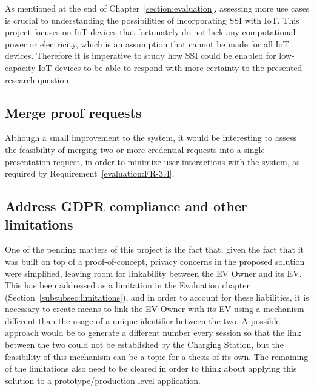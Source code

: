 As mentioned at the end of Chapter~\ref{section:evaluation}, assessing more use cases is crucial to understanding the possibilities of incorporating SSI with IoT. This project focuses on IoT devices that fortunately do not lack any computational power or electricity, which is an assumption that cannot be made for all IoT devices. Therefore it is imperative to study how SSI could be enabled for low-capacity IoT devices to be able to respond with more certainty to the presented research question.

\subsection*{Merge proof requests}
\label{subsubsec:merge_proof_requests}

Although a small improvement to the system, it would be interesting to assess the feasibility of merging two or more credential requests into a single presentation request, in order to minimize user interactions with the system, as required by Requirement~\ref{evaluation:FR-3.4}.

\subsection*{Address GDPR compliance and other limitations}
\label{subsubsec:address_gdpr_compliance}

One of the pending matters of this project is the fact that, given the fact that it was built on top of a proof-of-concept, privacy concerns in the proposed solution were simplified, leaving room for linkability between the EV Owner and its EV. This has been addressed as a limitation in the Evaluation chapter (Section~\ref{subsubsec:limitations}), and in order to account for these liabilities, it is necessary to create means to link the EV Owner with its EV using a mechanism different than the usage of a unique identifier between the two. A possible approach would be to generate a different number every session so that the link between the two could not be established by the Charging Station, but the feasibility of this mechanism can be a topic for a thesis of its own. The remaining of the limitations also need to be cleared in order to think about applying this solution to a prototype/production level application.

